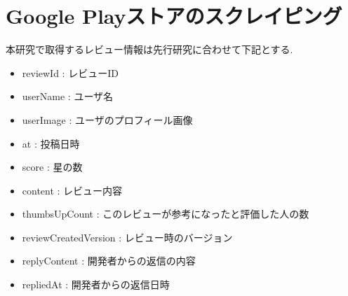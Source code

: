 
\section{Google Playストアのスクレイピング}
本研究で取得するレビュー情報は先行研究に合わせて下記とする. 

\begin{itemize}
 \item reviewId : レビューID
 \item userName : ユーザ名
 \item userImage : ユーザのプロフィール画像
 \item at : 投稿日時
 \item score : 星の数
 \item content : レビュー内容
 \item thumbsUpCount : このレビューが参考になったと評価した人の数
 \item reviewCreatedVersion : レビュー時のバージョン
 \item replyContent : 開発者からの返信の内容
 \item repliedAt : 開発者からの返信日時
\end{itemize}

